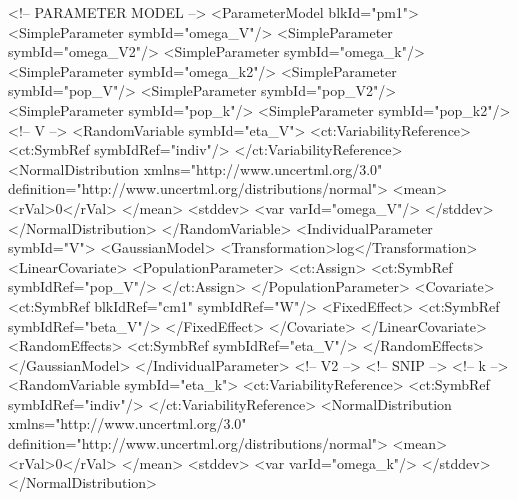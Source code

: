 \documentclass[a4paper,10pt]{article}
\begin{document}
\begin{xmlcode}
        <!-- PARAMETER MODEL -->
        <ParameterModel blkId="pm1">
            <SimpleParameter symbId="omega_V"/>
            <SimpleParameter symbId="omega_V2"/>
            <SimpleParameter symbId="omega_k"/>
            <SimpleParameter symbId="omega_k2"/>
            <SimpleParameter symbId="pop_V"/>
            <SimpleParameter symbId="pop_V2"/>
            <SimpleParameter symbId="pop_k"/>
            <SimpleParameter symbId="pop_k2"/>
            <!-- V -->
            <RandomVariable symbId="eta_V">
                <ct:VariabilityReference>
                    <ct:SymbRef symbIdRef="indiv"/>
                </ct:VariabilityReference>
                <NormalDistribution xmlns="http://www.uncertml.org/3.0" definition="http://www.uncertml.org/distributions/normal">
                    <mean>
                        <rVal>0</rVal>
                    </mean>
                    <stddev>
                        <var varId="omega_V"/>
                    </stddev>
                </NormalDistribution>
            </RandomVariable>
            <IndividualParameter symbId="V">
                <GaussianModel>
                    <Transformation>log</Transformation>
                    <LinearCovariate>
                        <PopulationParameter>
                            <ct:Assign>
                                <ct:SymbRef symbIdRef="pop_V"/>
                            </ct:Assign>
                        </PopulationParameter>
                        <Covariate>
                            <ct:SymbRef blkIdRef="cm1" symbIdRef="W"/>
                            <FixedEffect>
                                <ct:SymbRef symbIdRef="beta_V"/>
                            </FixedEffect>
                        </Covariate>
                    </LinearCovariate>
                    <RandomEffects>
                        <ct:SymbRef symbIdRef="eta_V"/>
                    </RandomEffects>
                </GaussianModel>
            </IndividualParameter>
            <!-- V2 -->
	    <!-- SNIP -->
            <!-- k -->
            <RandomVariable symbId="eta_k">
                <ct:VariabilityReference>
                    <ct:SymbRef symbIdRef="indiv"/>
                </ct:VariabilityReference>
                <NormalDistribution xmlns="http://www.uncertml.org/3.0" definition="http://www.uncertml.org/distributions/normal">
                    <mean>
                        <rVal>0</rVal>
                    </mean>
                    <stddev>
                        <var varId="omega_k"/>
                    </stddev>
                </NormalDistribution>

\end{xmlcode}
\end{document}
